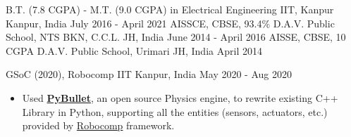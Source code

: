 \documentclass[a4paper]{MagicalCV}
\begin{document}
\hfill
\begin{minipage}[t]{0.49\textwidth} 


\begin{cventries}
  \cventry
    {B.T. (7.8 CGPA) - M.T. (9.0 CGPA) in Electrical Engineering} %
    {IIT, Kanpur} %
    {Kanpur, India} %
    {July 2016 - April 2021} %
    {}
\vspace*{-2mm}
  \cventry
    {AISSCE, CBSE, 93.4\%}
    {D.A.V. Public School, NTS BKN, C.C.L.}
    {JH, India}
    {June 2014 - April 2016}
    {}
\vspace*{-2mm}
  \cventry
    {AISSE, CBSE, 10 CGPA}
    {D.A.V. Public School, Urimari}
    {JH, India}
    {April 2014}
    {}    
\end{cventries}


\vspace*{-\baselineskip}

\begin{cventries}

\cventry
  {}
  {GSoC (2020), Robocomp}
  {IIT Kanpur, India}
  {May 2020 - Aug 2020}
  {
    \vspace*{-\baselineskip}
    \item \hspace{2pt} 
    \begin{itemize}[leftmargin=6mm]
        \item Used \href{https://pybullet.org/wordpress/}{\textbf{PyBullet}}, an open source Physics engine, to rewrite existing C++ Library in Python, supporting all the entities (sensors, actuators, etc.) provided by \href{https://github.com/robocomp/robocomp}{Robocomp} framework.
    \end{itemize}
    }


\end{cventries}
\end{minipage}
\end{document}
